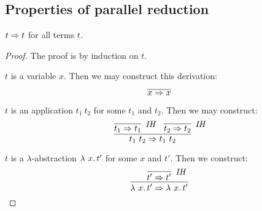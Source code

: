 \subsection{Properties of parallel reduction}

\begin{lemma}
  \label{lem:predrefl}
  $t \Rightarrow t$ for all terms $t$.
\end{lemma}
\begin{proof}
  The proof is by induction on $t$.

  \case{ } $t$ is a variable $x$. Then we may construct this derivation:
  \[
  \infer{x \Pred x}{\ }
  \]
  
\case{ } $t$ is an application $t_1\ t_2$ for some $t_1$ and $t_2$. Then we may construct:
\[
\infer{t_1\ t_2 \Pred t_1\ t_2}{\infer[\textit{IH}]{t_1 \Pred t_1}{\ } & \infer[\textit{IH}]{t_2 \Pred t_2}{\ }}
\]

\case{ } $t$ is a $\lambda$-abstraction $\lambda\ x.\, t'$ for some $x$ and $t'$. Then we construct:
\[
\infer{\lam{x}{t'} \Pred \lam{x}{t'}}{\infer[\textit{IH}]{t' \Pred t'}{\ }}
\]
\end{proof}

